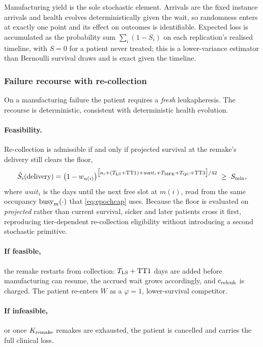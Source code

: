 Manufacturing yield is the sole stochastic element. Arrivals are the fixed
instance arrivals and health evolves deterministically given the wait, so
randomness enters at exactly one point and its effect on outcomes is
identifiable. Expected loss is accumulated as the probability sum $\sum_i (1 -
S_i)$ on each replication's realised timeline, with $S = 0$ for a patient never
treated; this is a lower-variance estimator than Bernoulli survival draws and
is exact given the timeline.

\subsubsection{Failure recourse with re-collection}
\label{sec:recourse}

On a manufacturing failure the patient requires a \emph{fresh} leukapheresis.
The recourse is deterministic, consistent with deterministic health evolution.

\paragraph{Feasibility.} Re-collection is admissible if and only if projected
survival at the remake's delivery still clears the floor,
\begin{equation}
  \hat{S}_i(\text{delivery}) =
  \bigl(1 - w_{u(i)}\bigr)^{\bigl[a_i + (T_{\mathrm{LS}} + \mathrm{TT1}) + \mathit{wait}_i
    + T_{\mathrm{MFE}} + T_{\mathrm{QC}} + \mathrm{TT3}\bigr]/42} \;\ge\; S_{\min}, \label{eq:gate}
\end{equation}
where $\mathit{wait}_i$ is the days until the next free slot at $m(i)$, read
from the same occupancy $\mathrm{busy}_m(\cdot)$ that \eqref{eq:epochcap} uses. Because
the floor is evaluated on \emph{projected} rather than current survival, sicker
and later patients cross it first, reproducing tier-dependent re-collection
eligibility without introducing a second stochastic primitive.

\paragraph{If feasible,} the remake restarts from collection: $T_{\mathrm{LS}} + \mathrm{TT1}$
days are added before manufacturing can resume, the accrued wait grows
accordingly, and $c_{\mathrm{releuk}}$ is charged. The patient re-enters $W$ as a
$\varphi = 1$, lower-survival competitor.

\paragraph{If infeasible,} or once $K_{\mathrm{remake}}$ remakes are exhausted, the patient is
cancelled and carries the full clinical loss.

